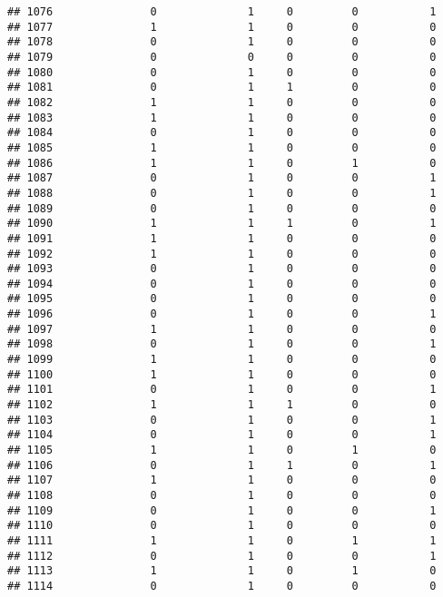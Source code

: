 \documentclass[]{article}
\begin{document}
\begin{verbatim}
## 1076               0              1     0         0           1
## 1077               1              1     0         0           0
## 1078               0              1     0         0           0
## 1079               0              0     0         0           0
## 1080               0              1     0         0           0
## 1081               0              1     1         0           0
## 1082               1              1     0         0           0
## 1083               1              1     0         0           0
## 1084               0              1     0         0           0
## 1085               1              1     0         0           0
## 1086               1              1     0         1           0
## 1087               0              1     0         0           1
## 1088               0              1     0         0           1
## 1089               0              1     0         0           0
## 1090               1              1     1         0           1
## 1091               1              1     0         0           0
## 1092               1              1     0         0           0
## 1093               0              1     0         0           0
## 1094               0              1     0         0           0
## 1095               0              1     0         0           0
## 1096               0              1     0         0           1
## 1097               1              1     0         0           0
## 1098               0              1     0         0           1
## 1099               1              1     0         0           0
## 1100               1              1     0         0           0
## 1101               0              1     0         0           1
## 1102               1              1     1         0           0
## 1103               0              1     0         0           1
## 1104               0              1     0         0           1
## 1105               1              1     0         1           0
## 1106               0              1     1         0           1
## 1107               1              1     0         0           0
## 1108               0              1     0         0           0
## 1109               0              1     0         0           1
## 1110               0              1     0         0           0
## 1111               1              1     0         1           1
## 1112               0              1     0         0           1
## 1113               1              1     0         1           0
## 1114               0              1     0         0           0

\end{verbatim}
\end{document}
